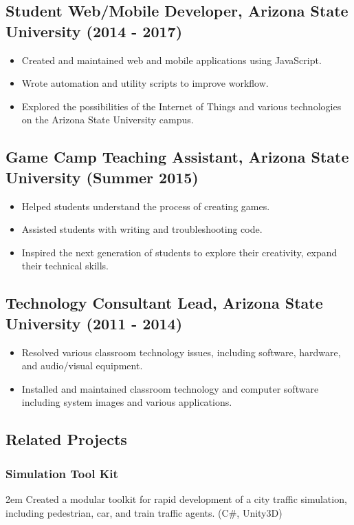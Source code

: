 \documentclass[letterpaper, 10pt]{article}
\begin{document}
\subsection{Student Web/Mobile Developer, Arizona State University (2014 \-- 2017)}
\begin{itemize}
\setlength\itemsep{-0.25em}
\item Created and maintained web and mobile applications using JavaScript.
\item Wrote automation and utility scripts to improve workflow.
\item Explored the possibilities of the Internet of Things and various technologies on the Arizona State University campus.
\end{itemize}

\subsection{Game Camp Teaching Assistant, Arizona State University (Summer 2015)}
\begin{itemize}
\setlength\itemsep{-0.25em}
\item Helped students understand the process of creating games.
\item Assisted students with writing and troubleshooting code.
\item Inspired the next generation of students to explore their creativity, expand their technical skills.
\end{itemize}

\subsection{Technology Consultant Lead, Arizona State University (2011 \-- 2014)}
\begin{itemize}
\setlength\itemsep{-0.25em}
\item Resolved various classroom technology issues, including software, hardware, and audio/visual equipment.
\item Installed and maintained classroom technology and computer software including system images and various applications.
\end{itemize}

\subsection{Related Projects}

\subsubsection{Simulation Tool Kit}
\hangindent2em Created a modular toolkit for rapid development of a city traffic simulation, including pedestrian, car, and train traffic agents. (C\#, Unity3D)
\end{document}

